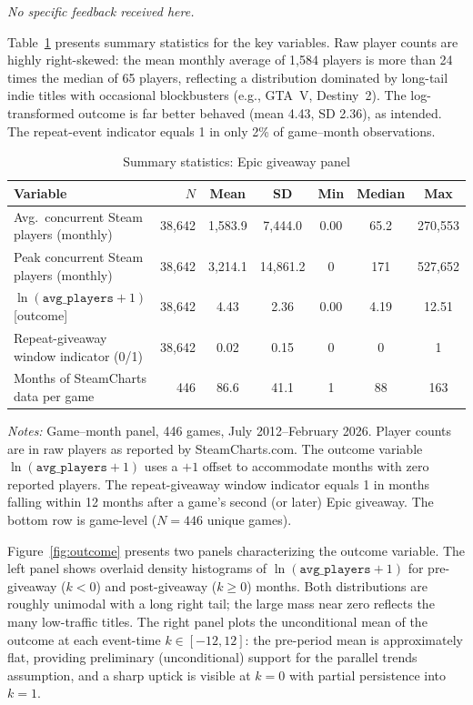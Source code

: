 \documentclass[11pt]{article}
\begin{document}
\textit{No specific feedback received here.}

Table~\ref{tab:sumstats} presents summary statistics for the key variables.
Raw player counts are highly right-skewed: the mean monthly average of
1{,}584 players is more than 24 times the median of 65 players, reflecting a
distribution dominated by long-tail indie titles with occasional blockbusters
(e.g., GTA~V, Destiny~2). The log-transformed outcome is far better behaved
(mean 4.43, SD 2.36), as intended. The repeat-event indicator equals 1 in
only 2\% of game--month observations.

\begin{table}[H]
\centering\small
\caption{Summary statistics: Epic giveaway panel}
\label{tab:sumstats}
\begin{tabular}{lrccccc}
\toprule
Variable & $N$ & Mean & SD & Min & Median & Max \\
\midrule
Avg.\ concurrent Steam players (monthly) & 38,642 & 1,583.9 & 7,444.0 & 0.00 & 65.2 & 270,553 \\
Peak concurrent Steam players (monthly)  & 38,642 & 3,214.1 & 14,861.2 & 0 & 171 & 527,652 \\
$\ln(\texttt{avg\_players}+1)$ [outcome] & 38,642 & 4.43 & 2.36 & 0.00 & 4.19 & 12.51 \\
Repeat-giveaway window indicator (0/1)   & 38,642 & 0.02 & 0.15 & 0 & 0 & 1 \\
\midrule
Months of SteamCharts data per game & 446 & 86.6 & 41.1 & 1 & 88 & 163 \\
\bottomrule
\end{tabular}
\medskip

\noindent\small\textit{Notes:} Game--month panel, 446 games, July 2012--February 2026.
  Player counts are in raw players as reported by SteamCharts.com.
  The outcome variable $\ln(\texttt{avg\_players}+1)$ uses a $+1$ offset to
  accommodate months with zero reported players.
  The repeat-giveaway window indicator equals 1 in months falling within
  12 months after a game's second (or later) Epic giveaway.
  The bottom row is game-level ($N = 446$ unique games).
\end{table}

Figure~\ref{fig:outcome} presents two panels characterizing the outcome
variable. The left panel shows overlaid density histograms of
$\ln(\texttt{avg\_players}+1)$ for pre-giveaway ($k < 0$) and post-giveaway
($k \geq 0$) months. Both distributions are roughly unimodal with a long
right tail; the large mass near zero reflects the many low-traffic titles.
The right panel plots the unconditional mean of the outcome at each event-time
$k \in [-12, 12]$: the pre-period mean is approximately flat, providing
preliminary (unconditional) support for the parallel trends assumption, and a
sharp uptick is visible at $k = 0$ with partial persistence into $k = 1$.
\end{document}
